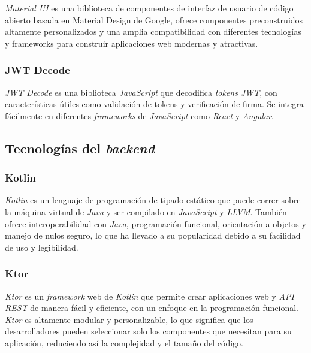 \textit{Material UI} \citep{material-ui} es una biblioteca de componentes de interfaz de usuario de código abierto basada en Material Design de Google, ofrece componentes preconstruidos altamente personalizados y una amplia compatibilidad con diferentes tecnologías y frameworks para construir aplicaciones web modernas y atractivas.


\subsubsection{JWT Decode}

\textit{JWT Decode} \citep{jwt-decode} es una biblioteca \textit{JavaScript} que decodifica \textit{tokens JWT}, con características útiles como validación de tokens y verificación de firma. Se integra fácilmente en diferentes \textit{frameworks} de \textit{JavaScript} como \textit{React} y \textit{Angular}.


\subsection{Tecnologías del \textit{backend}}


\subsubsection{Kotlin}

\textit{Kotlin} \citep{kotlin} es un lenguaje de programación de tipado estático que puede correr sobre la máquina virtual de \textit{Java} y ser compilado en \textit{JavaScript} y \textit{LLVM}. También ofrece interoperabilidad con \textit{Java}, programación funcional, orientación a objetos y manejo de nulos seguro, lo que ha llevado a su popularidad debido a su facilidad de uso y legibilidad.


\subsubsection{Ktor}

\textit{Ktor} \citep{ktor} es un \textit{framework} web de \textit{Kotlin} que permite crear aplicaciones web y \textit{API REST} de manera fácil y eficiente, con un enfoque en la programación funcional. \textit{Ktor} es altamente modular y personalizable, lo que significa que los desarrolladores pueden seleccionar solo los componentes que necesitan para su aplicación, reduciendo así la complejidad y el tamaño del código. 


